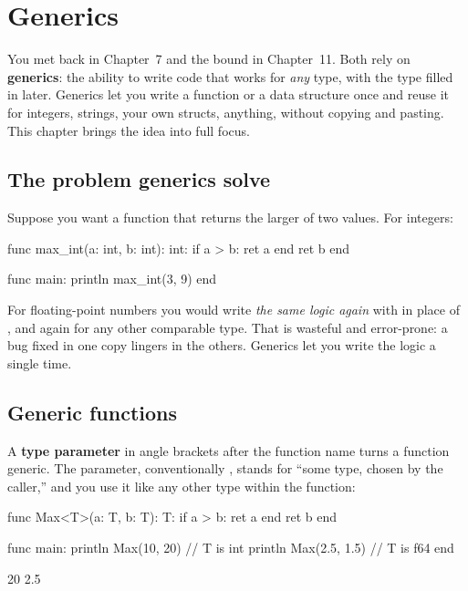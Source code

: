 \chapter{Generics}%
\label{ch:generics}

You met  back in Chapter~7 and the bound  in
Chapter~11. Both rely on \textbf{generics}: the ability to write code that works
for \emph{any} type, with the type filled in later. Generics let you write a
function or a data structure once and reuse it for integers, strings, your own
structs, anything, without copying and pasting. This chapter brings the idea
into full focus.

\section{The problem generics solve}

Suppose you want a function that returns the larger of two values. For integers:

\begin{salamen}
func max_int(a: int, b: int): int:
    if a > b: ret a end
    ret b
end

func main:
    println max_int(3, 9)
end
\end{salamen}

For floating-point numbers you would write \emph{the same logic again} with
 in place of , and again for any other comparable type. That
is wasteful and error-prone: a bug fixed in one copy lingers in the others.
Generics let you write the logic a single time.

\section{Generic functions}

A \textbf{type parameter} in angle brackets after the function name turns a
function generic. The parameter, conventionally , stands for ``some
type, chosen by the caller,'' and you use it like any other type within the
function:

\begin{salamen}
func Max<T>(a: T, b: T): T:
    if a > b: ret a end
    ret b
end

func main:
    println Max(10, 20)        // T is int
    println Max(2.5, 1.5)      // T is f64
end
\end{salamen}

\begin{progout}
20
2.5
\end{progout}

